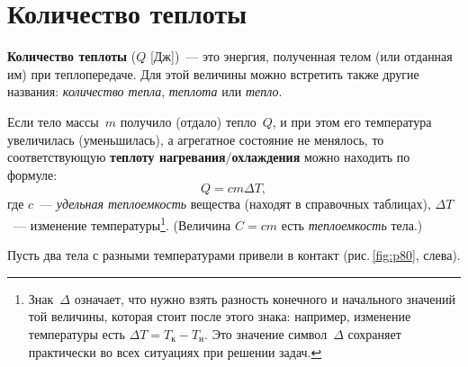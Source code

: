 \documentclass[main.tex]{subfiles}
\begin{document}

 

 

 
   

\section{Количество теплоты}


\textbf{Количество теплоты} ($Q$ [Дж])~--- это энергия, полученная телом (или отданная им) при теплопередаче. Для этой величины можно встретить также другие названия: \emph{количество тепла}, \emph{теплота} или \emph{тепло}.

Если тело массы~$m$ получило (отдало) тепло~$Q$, и при этом его температура увеличилась (уменьшилась), а агрегатное состояние не менялось, то соответствующую \textbf{теплоту нагревания$/$охлаждения} можно находить по формуле:
\begin{equation}
    \label{23Q_e1}
    Q=cm\Delta T,
\end{equation}
где $c$~--- \emph{удельная теплоемкость} вещества (находят в справочных таблицах), $\Delta T$~--- изменение температуры\footnote{Знак~$\Delta$ означает, что нужно взять разность конечного и начального значений той величины, которая стоит после этого знака: например, изменение температуры есть $\Delta T=T_\text{к}-T_\text{н}$. Это значение символ~$\Delta$ сохраняет практически во всех ситуациях при решении задач.}. (Величина $C=cm$ есть \emph{теплоемкость} тела.)

Пусть два тела с разными температурами привели в контакт (рис.\,\ref{fig:p80}, слева).
\end{document}
